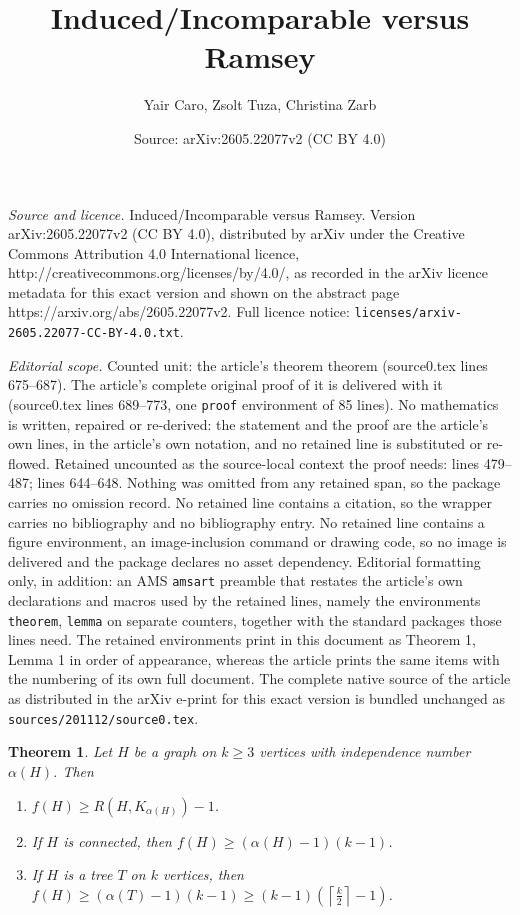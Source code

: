 \documentclass[10pt,a4paper]{amsart}
\title{Induced/Incomparable versus Ramsey}
\author{Yair Caro, Zsolt Tuza, Christina Zarb}
\date{Source: arXiv:2605.22077v2 (CC BY 4.0)}
\newtheorem{theorem}{Theorem}
\begin{document}
\maketitle

\noindent\emph{Source and licence.} Induced/Incomparable versus Ramsey. Version arXiv:2605.22077v2 (CC BY 4.0), distributed by arXiv under the Creative Commons Attribution 4.0 International licence, http://creativecommons.org/licenses/by/4.0/, as recorded in the arXiv licence metadata for this exact version and shown on the abstract page https://arxiv.org/abs/2605.22077v2. Full licence notice: \texttt{licenses/arxiv-2605.22077-CC-BY-4.0.txt}.\par\smallskip

\noindent\textit{Editorial scope.} Counted unit: the article's theorem theorem (source0.tex lines 675--687). The article's complete original proof of it is delivered with it (source0.tex lines 689--773, one \texttt{proof} environment of 85 lines). No mathematics is written, repaired or re-derived: the statement and the proof are the article's own lines, in the article's own notation, and no retained line is substituted or re-flowed.  Retained uncounted as the source-local context the proof needs: lines 479--487; lines 644--648.  Nothing was omitted from any retained span, so the package carries no omission record.  No retained line contains a citation, so the wrapper carries no bibliography and no bibliography entry.  No retained line contains a figure environment, an image-inclusion command or drawing code, so no image is delivered and the package declares no asset dependency.  Editorial formatting only, in addition: an AMS \texttt{amsart} preamble that restates the article's own declarations and macros used by the retained lines, namely the environments \texttt{theorem}, \texttt{lemma} on separate counters, together with the standard packages those lines need.  The retained environments print in this document as Theorem 1, Lemma 1 in order of appearance, whereas the article prints the same items with the numbering of its own full document.  The complete native source of the article as distributed in the arXiv e-print for this exact version is bundled unchanged as \texttt{sources/201112/source0.tex}.
\begin{theorem}\label{treethree}
Let $H$ be a graph on $k\geq 3$ vertices with independence number $\alpha(H)$.  Then 
\begin{enumerate}
\item{$f(H) \geq R(H,K_{\alpha(H)}) - 1$.  }
\item{If $H$ is connected, then  $f(H)  \geq (\alpha(H) - 1)(k-1)$.}
\item{If $H$ is a tree $T$ on $k$ vertices, then $f(H) \geq (\alpha(T)-1)(k-1) \geq
 (k-1)(\left \lceil \frac{k}{2} \right \rceil -1)$}.
\end{enumerate}
\end{theorem}
\end{document}
